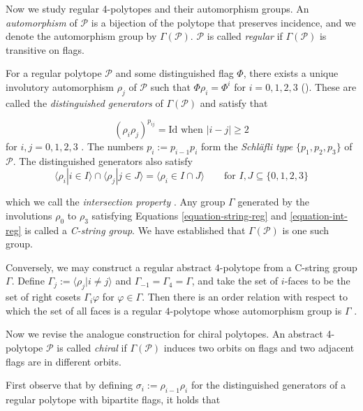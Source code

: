 \documentclass{amsart}
\begin{document}
Now we study regular 4-polytopes and their automorphism groups. An
\textit{automorphism} of $\mathcal{P}$ is a bijection of the polytope that
preserves incidence, and we denote the automorphism group by
$\Gamma(\mathcal{P})$. $\mathcal{P}$ is called \textit{regular} if
$\Gamma(\mathcal{P})$ is transitive on flags.
	
For a regular polytope $\mathcal{P}$ and some distinguished flag $\Phi$, there
exists a unique involutory automorphism $\rho_j$ of $\mathcal{P}$ such that
$\Phi\rho_i=\Phi^i$ for $i=0,1,2,3$ (\cite[Proposition 2B4]{ARP}). These are called
the \textit{distinguished generators} of $\Gamma(\mathcal{P})$ and satisfy that 

\begin{equation}
\label{equation-string-reg}
(\rho_i\rho_j)^{p_{ij}}=\text{Id}\text{ when } |i-j|\geq 2
\end{equation}
for $i,j=0,1,2,3$ \cite[Proposition 2B11]{ARP}. The numbers $p_i:=p_{i-1}p_i$
form the \textit{Schläfli type} $\{p_1,p_2,p_3\}$ of $\mathcal{P}$. The
distinguished generators also satisfy 
\begin{equation}
\label{equation-int-reg}
\langle \rho_i|i\in I\rangle\cap\langle\rho_j|j\in J\rangle
=\langle\rho_i\in I\cap J\rangle\qquad\text{for }I,J\subseteq\{0,1,2,3\}
\end{equation}

which we call the \textit{intersection property} \cite[Proposition 2B10]{ARP}.
Any group $\Gamma$ generated by the involutions $\rho_0$ to $\rho_3$ satisfying
Equations \ref{equation-string-reg} and \ref{equation-int-reg} is called a
\textit{C-string group}. We have established that $\Gamma(\mathcal{P})$ is one
such group.

Conversely, we may construct a regular abstract $4$-polytope from a C-string
group $\Gamma$. Define $\Gamma_j:=\langle\rho_j|i\neq j\rangle$ and
$\Gamma_{-1}=\Gamma_4=\Gamma$, and take the set of $i$-faces to be the set of
right cosets $\Gamma_i\varphi$ for $\varphi\in\Gamma$. Then there is an order
relation with respect to which the set of all faces is a regular $4$-polytope
whose automorphism group is $\Gamma$ \cite[Theorem 2E11]{ARP}.

\bigskip\noindent

Now we revise the analogue construction for chiral polytopes. An abstract
4-polytope $\mathcal{P}$ is called \textit{chiral} if $\Gamma(\mathcal{P})$
induces two orbits on flags and two adjacent flags are in different orbits.
	
First observe that by defining $\sigma_i:=\rho_{i-1}\rho_i$ for the
distinguished generators of a regular polytope with bipartite flags, it holds
that
\end{document}
